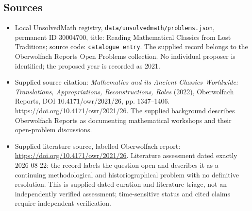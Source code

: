 \documentclass[11pt]{article}
\begin{document}
\subsection{Sources}
\begin{itemize}
\item Local UnsolvedMath registry, \texttt{data/unsolvedmath/problems.json}, permanent ID \(30004700\), title: Reading Mathematical Classics from Lost Traditions; source code: \texttt{catalogue entry}. The supplied record belongs to the Oberwolfach Reports Open Problems collection. No individual proposer is identified; the proposed year is recorded as 2021.
\item Supplied source citation: \emph{Mathematics and its Ancient Classics Worldwide: Translations, Appropriations, Reconstructions, Roles} (2022), Oberwolfach Reports, DOI 10.4171/owr/2021/26, pp. 1347--1406. \url{https://doi.org/10.4171/owr/2021/26}. The supplied background describes Oberwolfach Reports as documenting mathematical workshops and their open-problem discussions.
\item Supplied literature source, labelled Oberwolfach report: \url{https://doi.org/10.4171/owr/2021/26}. Literature assessment dated exactly 2026-08-22: the record labels the question open and describes it as a continuing methodological and historiographical problem with no definitive resolution. This is supplied dated curation and literature triage, not an independently verified assessment; time-sensitive status and cited claims require independent verification.
\end{itemize}
\end{document}
